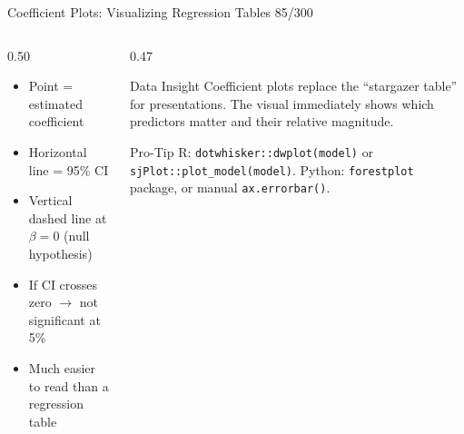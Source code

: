 \documentclass[10pt]{beamer}
\newcommand{\smark}[1]{\hfill{\scriptsize\color{codegray}#1}}
\begin{document}
\begin{frame}{Coefficient Plots: Visualizing Regression Tables}
\smark{85/300}
\begin{columns}[T]
\begin{column}{0.50\textwidth}
\begin{itemize}
    \item Point = estimated coefficient
    \item Horizontal line = 95\% CI
    \item Vertical dashed line at $\beta = 0$ (null hypothesis)
    \item If CI crosses zero $\to$ not significant at 5\%
    \item Much easier to read than a regression table
\end{itemize}
\end{column}
\begin{column}{0.47\textwidth}
\begin{exampleblock}{Data Insight}
    \scriptsize Coefficient plots replace the ``stargazer table'' for presentations. The visual immediately shows which predictors matter and their relative magnitude.
\end{exampleblock}
\vspace{0.1cm}
\begin{alertblock}{Pro-Tip}
    \scriptsize R: \texttt{dotwhisker::dwplot(model)} or \texttt{sjPlot::plot\_model(model)}. Python: \texttt{forestplot} package, or manual \texttt{ax.errorbar()}.
\end{alertblock}
\end{column}
\end{columns}
\end{frame}
\end{document}
